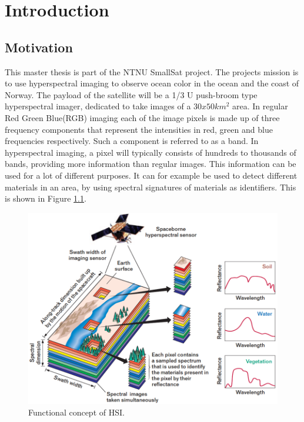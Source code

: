 \newpage
\chapter{Introduction}
\label{sec:introduction}
\section{Motivation}

This master thesis is part of the NTNU SmallSat \cite{SmallSat_project_description} project. The projects mission is to use hyperspectral imaging to observe ocean color in the ocean and the coast of Norway. The payload of the satellite will be a 1/3 U push-broom type hyperspectral imager, dedicated to take images of a $30x50 km^2$ area. In regular Red Green Blue(RGB) imaging each of the image pixels is made up of three frequency components that represent the intensities in red, green and blue frequencies respectively. Such a component is referred to as a band. In hyperspectral imaging, a pixel will typically consists of hundreds to thousands of bands, providing more information than regular images. This information can be used for a lot of different purposes. It can for example be used to detect different materials in an area, by using spectral signatures of materials as identifiers. This is shown in Figure \ref{fig:HSI_concept}.\\

\begin{figure}[H]
\centering
   \includegraphics[scale=0.4]{images/Imaging-Spectroscopy-Concept.png}
  \caption{ Functional concept of HSI.\cite{HSI_concept} } 
  \label{fig:HSI_concept}
\end{figure}

